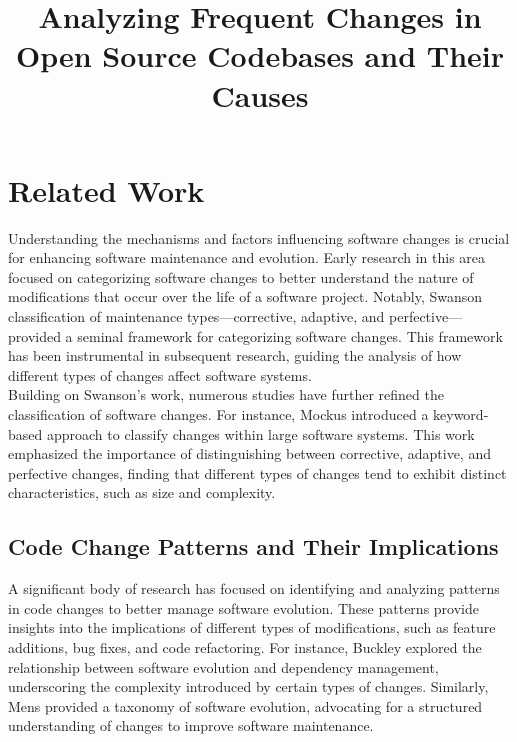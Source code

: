 \documentclass{article}
\title{Analyzing Frequent Changes in Open Source Codebases and Their Causes}
\begin{document}
\maketitle

\section{Related Work}

Understanding the mechanisms and factors influencing software changes is crucial for enhancing software maintenance and evolution. Early research in this area focused on categorizing software changes to better understand the nature of modifications that occur over the life of a software project. Notably, Swanson \cite{swanson1976dimensions} classification of maintenance types—corrective, adaptive, and perfective—provided a seminal framework for categorizing software changes. This framework has been instrumental in subsequent research, guiding the analysis of how different types of changes affect software systems.\\

Building on Swanson's work, numerous studies have further refined the classification of software changes. For instance, Mockus \cite{mockus2000identifying} introduced a keyword-based approach to classify changes within large software systems. This work emphasized the importance of distinguishing between corrective, adaptive, and perfective changes, finding that different types of changes tend to exhibit distinct characteristics, such as size and complexity.\\


\subsection{Code Change Patterns and Their Implications}

A significant body of research has focused on identifying and analyzing patterns in code changes to better manage software evolution. These patterns provide insights into the implications of different types of modifications, such as feature additions, bug fixes, and code refactoring. For instance, Buckley\cite{buckley2005towards} explored the relationship between software evolution and dependency management, underscoring the complexity introduced by certain types of changes. Similarly, Mens\cite{mens2003towards} provided a taxonomy of software evolution, advocating for a structured understanding of changes to improve software maintenance.
\end{document}
